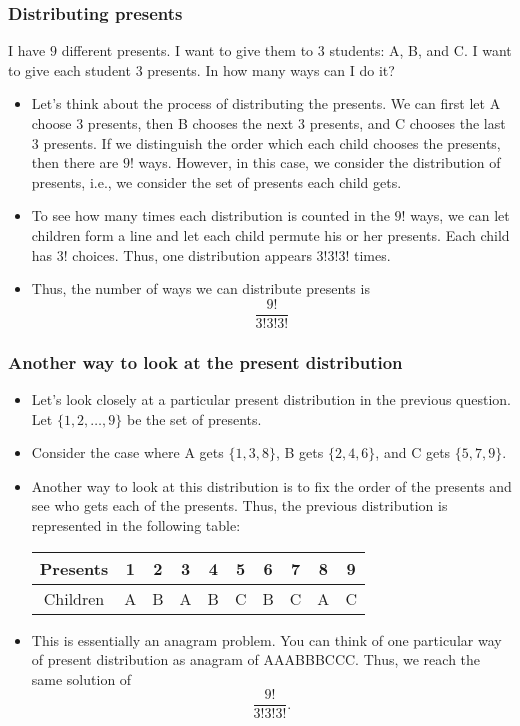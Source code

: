 \begin{frame}\frametitle{Distributing presents}
  \begin{tcolorbox}
    I have $9$ different presents.  I want to give them to $3$
    students: A, B, and C.  I want to give each student $3$ presents.
    In how many ways can I do it?
  \end{tcolorbox}
  
  \pause

  {\small
    \begin{itemize}
    \item Let's think about the process of distributing the
      presents. \pause We can first let A choose $3$ presents, then B
      chooses the next $3$ presents, and C chooses the last $3$
      presents. \pause If we distinguish the order which each child
      chooses the presents, then there are $9!$ ways. \pause However, in
      this case, we consider the distribution of presents, i.e., we
      consider the set of presents each child gets. \pause
    \item To see how many times each distribution is counted in the $9!$
      ways, we can let children form a line and let each child permute
      his or her presents.  Each child has $3!$ choices.  Thus, one
      distribution appears $3!3!3!$ times. \pause
    \item Thus, the number of ways we can distribute presents is
      \[ 
      \frac{9!}{3!3!3!}
      \]
    \end{itemize}
  }
\end{frame}

\begin{frame}\frametitle{Another way to look at the present distribution}
  \begin{itemize}
  \item Let's look closely at a particular present distribution in the
    previous question.  Let $\{1,2,\ldots,9\}$ be the set of presents.
  \item Consider the case where A gets $\{1,3,8\}$, B gets
    $\{2,4,6\}$, and C gets $\{5,7,9\}$. \pause
  \item Another way to look at this distribution is to fix the order
    of the presents and see who gets each of the presents.  Thus, the
    previous distribution is represented in the following table:
    \begin{tabular}{|c|c|c|c|c|c|c|c|c|c|}
      Presents & 1 & 2 & 3 & 4 & 5 & 6 & 7 & 8 & 9\\ \hline
      Children & A & B & A & B & C & B & C & A & C
    \end{tabular}
  \item \pause This is essentially an anagram problem.  You can think
    of one particular way of present distribution as anagram of
    AAABBBCCC.  Thus, we reach the same solution of
    \[\frac{9!}{3!3!3!}.\]
  \end{itemize}
\end{frame}

